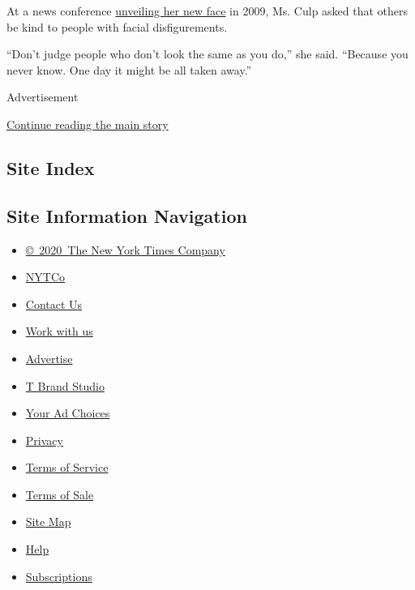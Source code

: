 At a news conference
\href{https://www.nytimes.com/2009/05/06/science/06face.html}{unveiling
her new face} in 2009, Ms. Culp asked that others be kind to people with
facial disfigurements.

``Don't judge people who don't look the same as you do,'' she said.
``Because you never know. One day it might be all taken away.''

Advertisement

\protect\hyperlink{after-bottom}{Continue reading the main story}

\hypertarget{site-index}{%
\subsection{Site Index}\label{site-index}}

\hypertarget{site-information-navigation}{%
\subsection{Site Information
Navigation}\label{site-information-navigation}}

\begin{itemize}
\tightlist
\item
  \href{https://help.nytimes.com/hc/en-us/articles/115014792127-Copyright-notice}{©~2020~The
  New York Times Company}
\end{itemize}

\begin{itemize}
\tightlist
\item
  \href{https://www.nytco.com/}{NYTCo}
\item
  \href{https://help.nytimes.com/hc/en-us/articles/115015385887-Contact-Us}{Contact
  Us}
\item
  \href{https://www.nytco.com/careers/}{Work with us}
\item
  \href{https://nytmediakit.com/}{Advertise}
\item
  \href{http://www.tbrandstudio.com/}{T Brand Studio}
\item
  \href{https://www.nytimes.com/privacy/cookie-policy\#how-do-i-manage-trackers}{Your
  Ad Choices}
\item
  \href{https://www.nytimes.com/privacy}{Privacy}
\item
  \href{https://help.nytimes.com/hc/en-us/articles/115014893428-Terms-of-service}{Terms
  of Service}
\item
  \href{https://help.nytimes.com/hc/en-us/articles/115014893968-Terms-of-sale}{Terms
  of Sale}
\item
  \href{https://spiderbites.nytimes.com}{Site Map}
\item
  \href{https://help.nytimes.com/hc/en-us}{Help}
\item
  \href{https://www.nytimes.com/subscription?campaignId=37WXW}{Subscriptions}
\end{itemize}

